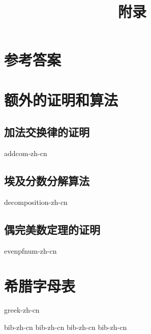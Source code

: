 \documentclass[b5paper]{ctexart}
\begin{document}
\title{附录}

\maketitle
\fi

\chapter{参考答案}
\label{ch:answers}
\shipoutAnswer

\chapter{额外的证明和算法}
\section{加法交换律的证明}
{addcom-zh-cn}

\section{埃及分数分解算法}
{decomposition-zh-cn}

\section{偶完美数定理的证明}
{evenpfnum-zh-cn}

\chapter{希腊字母表} \label{ch:greek-letters}
{greek-zh-cn}

\markboth{\bibname}{}

\begin{thebibliography}{99}
  {bib-zh-cn}
  {bib-zh-cn}
  {bib-zh-cn}
  {bib-zh-cn}
\end{thebibliography}

\ifx\wholebook\relax \else
\expandafter\enddocument
\fi
\end{document}
